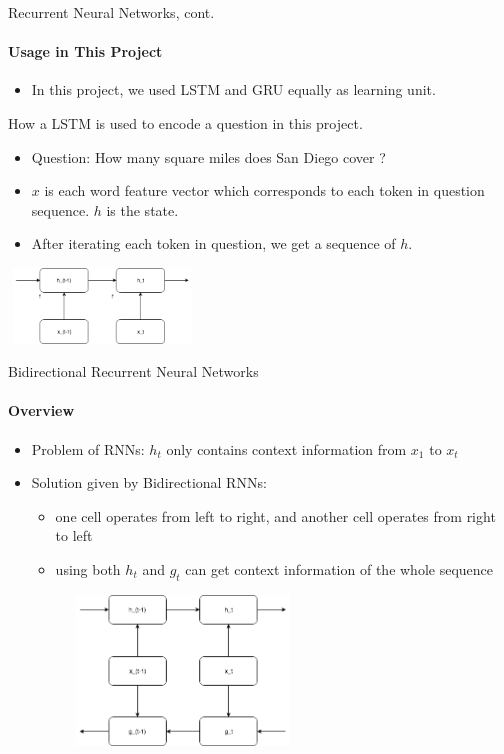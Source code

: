 \documentclass{beamer}
\begin{document}
\begin{frame}{Recurrent Neural Networks, cont.}\framesubtitle{Usage in This Project}
    \begin{itemize}
        \item In this project, we used LSTM and GRU equally as learning unit.
    \end{itemize}
    \begin{examples}{How a LSTM is used to encode a question in this project.}
        \begin{itemize}
            \item Question: How many square miles does San Diego cover ?
            \item $x$ is each word feature vector which corresponds to each token in question sequence. $h$ is the state.
            \item After iterating each token in question, we get a sequence of $h$.

        \end{itemize}
        \begin{center}
                  \includegraphics[width=5cm, height=2cm]{figures/rnnWithNoOutputs}
                \end{center}

    \end{examples}
\end{frame}

\begin{frame}{Bidirectional Recurrent Neural Networks}\framesubtitle{Overview }
    \begin{itemize}
        \item Problem of RNNs: $h_t$ only contains context information from $x_1$ to $x_t$
        \item Solution given by Bidirectional RNNs:
            \begin{itemize}
                \item one cell operates from left to right, and another cell operates from right to left
                \item using both $h_t$ and $g_t$ can get context information of the whole sequence
            \end{itemize}
             \begin{center}
                  \includegraphics[width=8cm, height=4cm]{figures/bidirectionalRnn.png}
            \end{center}
    \end{itemize}
\end{frame}
\end{document}
